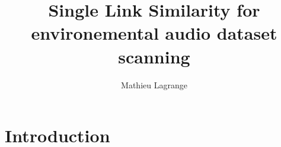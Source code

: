 \documentclass[a4paper, 11pt]{article}
\begin{document}
\title{Single Link Similarity for environemental audio dataset scanning}
\author{Mathieu Lagrange}
\date{}

\maketitle

\tableofcontents

\section{Introduction}





\end{document}
